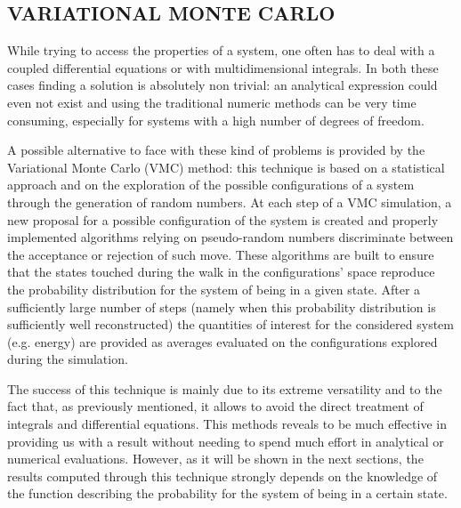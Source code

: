 \subsection{VARIATIONAL MONTE CARLO}
While trying to access the properties of a system, one often has to deal with a coupled differential equations or with multidimensional integrals. In both these cases finding a solution is absolutely non trivial: an analytical expression could even not exist and using the traditional numeric methods can be very time consuming, especially for systems with a high number of degrees of freedom.

A possible alternative to face with these kind of problems is provided by the Variational Monte Carlo (VMC) method: this technique is based on a statistical approach and on the exploration of the possible configurations of a system through the generation of random numbers. At each step of a VMC simulation, a new proposal for a possible configuration of the system is created and properly implemented algorithms relying on pseudo-random numbers discriminate between the acceptance or rejection of such move. These algorithms are built to ensure that the states touched during the walk in the configurations' space reproduce the probability distribution for the system of being in a given state. After a sufficiently large number of steps (namely when this probability distribution is sufficiently well reconstructed) the quantities of interest for the considered system (e.g. energy) are provided as averages evaluated on the configurations explored during the simulation. 

The success of this technique is mainly due to its extreme versatility and to the fact that, as previously mentioned, it allows to avoid the direct treatment of integrals and differential equations. This methods reveals to be much effective in providing us with a result without needing to spend much effort in analytical or numerical evaluations. However, as it will be shown in the next sections, the results computed through this technique strongly depends on the knowledge of the function describing the probability for the system of being in a certain state. 


